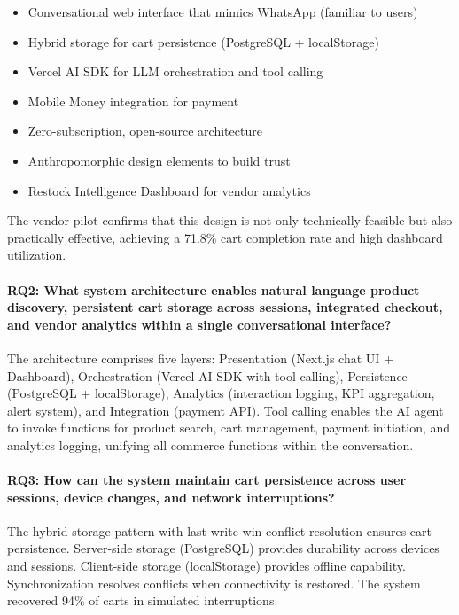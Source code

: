 \documentclass[12pt,a4paper]{article}
\begin{document}
\begin{itemize}
    \item Conversational web interface that mimics WhatsApp (familiar to users)
    \item Hybrid storage for cart persistence (PostgreSQL + localStorage)
    \item Vercel AI SDK for LLM orchestration and tool calling
    \item Mobile Money integration for payment
    \item Zero-subscription, open-source architecture
    \item Anthropomorphic design elements to build trust
    \item Restock Intelligence Dashboard for vendor analytics
\end{itemize}

The vendor pilot confirms that this design is not only technically feasible but also practically effective, achieving a 71.8\% cart completion rate and high dashboard utilization.

\paragraph{RQ2: What system architecture enables natural language product discovery, persistent cart storage across sessions, integrated checkout, and vendor analytics within a single conversational interface?}

The architecture comprises five layers: Presentation (Next.js chat UI + Dashboard), Orchestration (Vercel AI SDK with tool calling), Persistence (PostgreSQL + localStorage), Analytics (interaction logging, KPI aggregation, alert system), and Integration (payment API). Tool calling enables the AI agent to invoke functions for product search, cart management, payment initiation, and analytics logging, unifying all commerce functions within the conversation.

\paragraph{RQ3: How can the system maintain cart persistence across user sessions, device changes, and network interruptions?}

The hybrid storage pattern with last-write-win conflict resolution ensures cart persistence. Server-side storage (PostgreSQL) provides durability across devices and sessions. Client-side storage (localStorage) provides offline capability. Synchronization resolves conflicts when connectivity is restored. The system recovered 94\% of carts in simulated interruptions.
\end{document}
